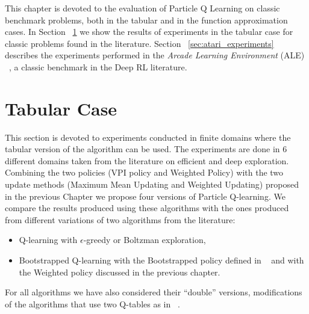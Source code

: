 This chapter is devoted to the evaluation of Particle Q Learning on classic benchmark problems, both in the tabular and in the function approximation cases. In Section ~\ref{sec:tabular_experiments} we show the results of experiments in the tabular case for classic problems found in the literature. Section ~\ref{sec:atari_experiments} describes the experiments performed in the \emph{Arcade Learning Environment} (ALE) ~\cite{Bellemare:2013:ALE:2566972.2566979}, a classic benchmark in the Deep RL literature. 
\section{Tabular Case} \label{sec:tabular_experiments}
This section is devoted to experiments conducted in finite domains where the tabular version of the algorithm can be used. The experiments are done in 6 different domains taken from the literature on efficient and deep exploration. Combining  the two policies (VPI policy and Weighted Policy) with the two update methods (Maximum Mean Updating and Weighted Updating) proposed in the previous Chapter we propose four versions of Particle Q-learning. We compare the results produced using these algorithms with the ones produced from different variations of two algorithms from the literature:
\begin{itemize}
\item Q-learning with $\epsilon$-greedy or Boltzman exploration,
\item Bootstrapped Q-learning with the Bootstrapped policy defined in ~\cite{DBLP:journals/corr/OsbandBPR16} and with the Weighted policy discussed in the previous chapter.
\end{itemize}
For all algorithms we have also considered their ``double'' versions, \ie modifications of the algorithms that use two Q-tables as in ~\cite{Hasselt:2016:DRL:3016100.3016191}. 
